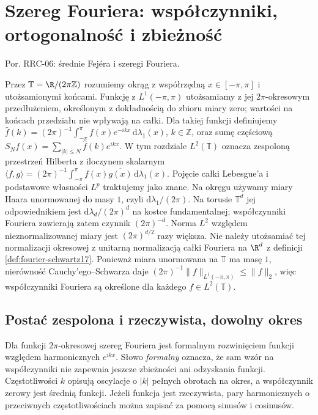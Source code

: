 
\section{Szereg Fouriera: współczynniki, ortogonalność i zbieżność}
\label{sec:dt-series-fourier}
\providecommand{\atlasref}[2]{#2}

Por. \atlasref{PDE-06::thm:pde6-fejer}{RRC-06: średnie Fejéra i szeregi Fouriera}.


Przez $\mathbb T=\R/(2\pi\mathbb Z)$ rozumiemy okrąg z
współrzędną $x\in[-\pi,\pi]$ i utożsamionymi końcami.
Funkcję z $L^1(-\pi,\pi)$ utożsamiamy z jej
$2\pi$-okresowym przedłużeniem, określonym z dokładnością
do zbioru miary zero; wartości na końcach przedziału
nie wpływają na całki. Dla takiej funkcji definiujemy
$\widehat f(k)=(2\pi)^{-1}\int_{-\pi}^{\pi}f(x)e^{-ikx}\,\mathrm d\lambda_1(x)$,
$k\in\mathbb Z$, oraz sumę częściową
$S_Nf(x)=\sum_{|k|\le N}\widehat f(k)e^{ikx}$.
W tym rozdziale $L^2(\mathbb T)$ oznacza zespoloną przestrzeń Hilberta
z iloczynem skalarnym
$\langle f,g\rangle=(2\pi)^{-1}\int_{-\pi}^{\pi}f(x)\overline{g(x)}\,\mathrm d\lambda_1(x)$.
Pojęcie całki Lebesgue'a i podstawowe własności $L^p$
traktujemy jako znane. Na okręgu używamy miary Haara
unormowanej do masy $1$, czyli $\mathrm d\lambda_1/(2\pi)$.
Na torusie $\mathbb T^d$ jej odpowiednikiem jest
$\mathrm d\lambda_d/(2\pi)^d$ na kostce fundamentalnej;
współczynniki Fouriera zawierają zatem czynnik $(2\pi)^{-d}$.
Norma $L^2$ względem nieznormalizowanej miary jest
$(2\pi)^{d/2}$ razy większa. Nie należy utożsamiać tej
normalizacji okresowej z unitarną normalizacją całki
Fouriera na $\R^d$ z definicji \ref{def:fourier-schwartz17}.
Ponieważ miara unormowana na
$\mathbb T$ ma masę $1$, nierówność Cauchy'ego--Schwarza
daje $(2\pi)^{-1}\|f\|_{L^1(-\pi,\pi)}\leq\|f\|_2$,
więc współczynniki Fouriera są określone dla każdego
$f\in L^2(\mathbb T)$.

\subsection{Postać zespolona i rzeczywista, dowolny okres}

Dla funkcji $2\pi$-okresowej szereg Fouriera jest
formalnym rozwinięciem funkcji względem harmonicznych
$e^{ikx}$. Słowo \emph{formalny} oznacza, że sam wzór
na współczynniki nie zapewnia jeszcze zbieżności
ani odzyskania funkcji. Częstotliwości $k$ opisują
oscylacje o $|k|$ pełnych obrotach na okres,
a współczynnik zerowy jest średnią funkcji.
Jeżeli funkcja jest rzeczywista, pary harmonicznych
o przeciwnych częstotliwościach można zapisać
za pomocą sinusów i cosinusów.

